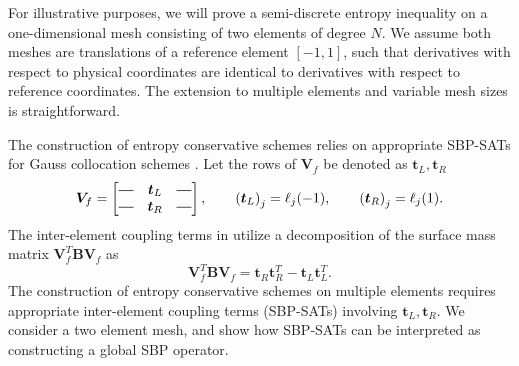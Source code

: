 \documentclass[review,onefignum,onetabnum,final]{siamart171218}
\newcommand{\LRp}[1]{\left( #1 \right)}
\newcommand*{\horzbar}{\rule[.5ex]{2.5ex}{0.5pt}}
\begin{document}
For illustrative purposes, we will prove a semi-discrete entropy inequality on a one-dimensional mesh consisting of two elements of degree $N$.  We assume both meshes are translations of a reference element  $[-1,1]$, such that derivatives with respect to physical coordinates are identical to derivatives with respect to reference coordinates.  The extension to multiple elements and variable mesh sizes is straightforward.  

The construction of entropy conservative schemes relies on appropriate SBP-SATs for Gauss collocation schemes \cite{fernandez2014review, crean2017high, fernandez2018simultaneous}.  Let the rows of $\bm{V}_f$ be denoted as $\bm{t}_L, \bm{t}_R$ 
\[
\bm{V}_f = \begin{bmatrix}
\horzbar & \bm{t}_L & \horzbar\\
\horzbar & \bm{t}_R & \horzbar
\end{bmatrix}, \qquad \LRp{\bm{t}_L}_j = \ell_j(-1), \qquad \LRp{\bm{t}_R}_j = \ell_j(1).
\]
The inter-element coupling terms in \cite{fernandez2014review, crean2017high, fernandez2018simultaneous} utilize a decomposition of the surface mass matrix $\bm{V}_f^T\bm{B}\bm{V}_f$ as  
\begin{equation}
\bm{V}_f^T\bm{B}\bm{V}_f 
= \bm{t}_R\bm{t}_R^T - \bm{t}_L\bm{t}_L^T.
\label{eq:bmatdecomp}
\end{equation}
The construction of entropy conservative schemes on multiple elements requires appropriate inter-element coupling terms (SBP-SATs) involving $\bm{t}_L, \bm{t}_R$.  We consider a two element mesh, and show how SBP-SATs can be interpreted as constructing a global SBP operator.  
\end{document}
